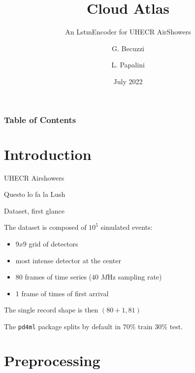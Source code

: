 \documentclass{beamer}
\title[Cloud Atlas] %
{Cloud Atlas}
\subtitle{An LstmEncoder for UHECR AirShowers}
\author[Gianluca Becuzzi, Lucia Papalini] %
{G. Becuzzi \and L. Papalini}
\date[July 2022] %
{July 2022}
\begin{document}
\frame{\titlepage}


\begin{frame}
\frametitle{Table of Contents}
\tableofcontents
\end{frame}


\section{Introduction}

\begin{frame}{UHECR Airshowers}

Questo lo fa la Lush

\end{frame}



\begin{frame}{Dataset, first glance}

    The dataset is composed of $10^5$ simulated events:

    \begin{itemize}
        \item $9 x 9$ grid of detectors
        \item most intense detector at the center 
        \item 80 frames of time series ($40$ $M$Hz sampling rate)
        \item 1 frame of times of first arrival 
    \end{itemize}

    The single record shape is then $(80 + 1 , 81)$

    The \texttt{pd4ml} package splits by default in $70\%$ train $30\%$ test.

\end{frame}


\section{Preprocessing}
\end{document}
